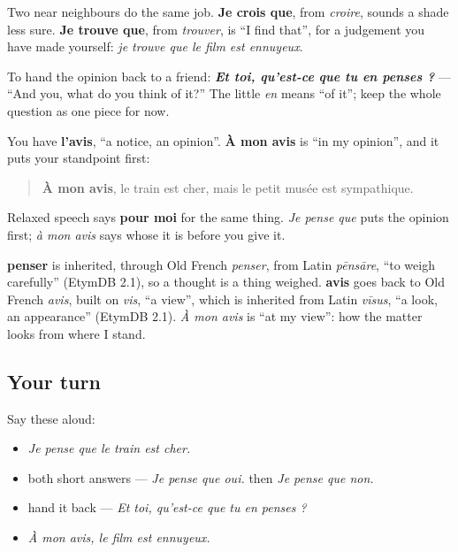 Two near neighbours do the same job. \textbf{Je crois que}, from \emph{croire}, sounds a shade less sure. \textbf{Je trouve que}, from \emph{trouver}, is \textquotedblleft{}I find that\textquotedblright{}, for a judgement you have made yourself: \emph{je trouve que le film est ennuyeux}.

To hand the opinion back to a friend: \emph{\textbf{Et toi, qu'est-ce que tu en penses ?}} — \textquotedblleft{}And you, what do you think of it?\textquotedblright{} The little \emph{en} means \textquotedblleft{}of it\textquotedblright{}; keep the whole question as one piece for now.

\begin{grammarlens}[title={Grammar Lens: à mon avis}]
You have \textbf{l'avis}, \textquotedblleft{}a notice, an opinion\textquotedblright{}. \textbf{À mon avis} is \textquotedblleft{}in my opinion\textquotedblright{}, and it puts your standpoint first:

\begin{quote}
\textbf{À mon avis}, le train est cher, mais le petit musée est sympathique.
\end{quote}

Relaxed speech says \textbf{pour moi} for the same thing. \emph{Je pense que} puts the opinion first; \emph{à mon avis} says whose it is before you give it.
\end{grammarlens}

\begin{cousinweb}
\textbf{penser} is inherited, through Old French \emph{penser}, from Latin \emph{pēnsāre}, \textquotedblleft{}to weigh carefully\textquotedblright{} (EtymDB 2.1), so a thought is a thing weighed. \textbf{avis} goes back to Old French \emph{avis}, built on \emph{vis}, \textquotedblleft{}a view\textquotedblright{}, which is inherited from Latin \emph{vīsus}, \textquotedblleft{}a look, an appearance\textquotedblright{} (EtymDB 2.1). \emph{À mon avis} is \textquotedblleft{}at my view\textquotedblright{}: how the matter looks from where I stand.
\end{cousinweb}

\subsection*{Your turn}
Say these aloud:

\begin{itemize}
\raggedright
  \item \emph{Je pense que le train est cher.}
  \item both short answers — \emph{Je pense que oui.} then \emph{Je pense que non.}
  \item hand it back — \emph{Et toi, qu'est-ce que tu en penses ?}
  \item \emph{À mon avis, le film est ennuyeux.}
\end{itemize}

